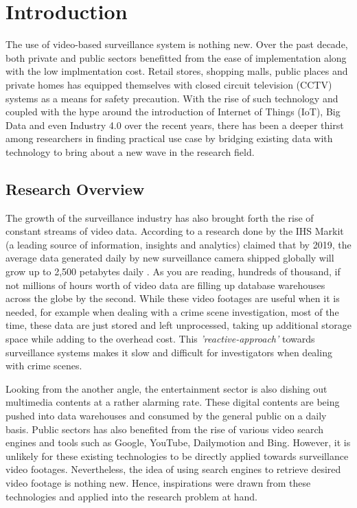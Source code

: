 \chapter{Introduction}
The use of video-based surveillance system is nothing new. Over the past decade, both private and public sectors benefitted from the ease of implementation along with the low implmentation cost.
Retail stores, shopping malls, public places and private homes has equipped themselves with closed circuit television (CCTV) systems as a means for safety precaution.
With the rise of such technology and coupled with the hype around the introduction of Internet of Things (IoT), Big Data and even Industry 4.0 over the recent years, there has been a deeper thirst among researchers in finding practical use case by bridging existing data with technology to bring about a new wave in the research field.

\section{Research Overview}
\label{section:introduction}

The growth of the surveillance industry has also brought forth the rise of constant streams of video data. According to a research done by the IHS Markit (a leading source of information, insights and analytics) claimed that by 2019, the average data generated daily by new surveillance camera shipped globally will grow up to 2,500 petabytes daily \cite{woodhouse2016big}.
As you are reading, hundreds of thousand, if not millions of hours worth of video data are filling up database warehouses across the globe by the second. While these video footages are useful when it is needed, for example when dealing with a crime scene investigation, most of the time, these data are just stored and left unprocessed, taking up additional storage space while adding to the overhead cost.
This \textit{'reactive-approach'} towards surveillance systems makes it slow and difficult for investigators when dealing with crime scenes.

Looking from the another angle, the entertainment sector is also dishing out multimedia contents at a rather alarming rate. These digital contents are being pushed into data warehouses and consumed by the general public on a daily basis. Public sectors has also benefited from the rise of various video search engines and tools such as Google, YouTube, Dailymotion and Bing. However, it is unlikely for these existing technologies to be directly applied towards surveillance video footages. Nevertheless, the idea of using search engines to retrieve desired video footage is nothing new. Hence, inspirations were drawn from these technologies and applied into the research problem at hand. %

